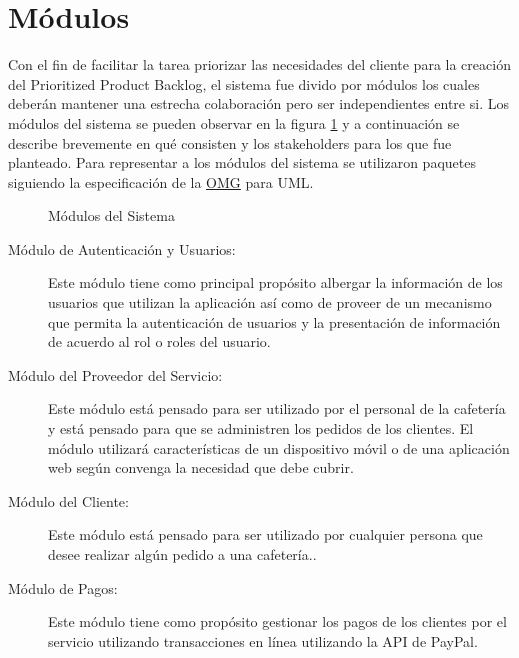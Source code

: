 \section{Módulos}

Con el fin de facilitar la tarea priorizar las necesidades del cliente para la creación del Prioritized Product Backlog, el sistema fue divido por módulos los cuales deberán mantener una estrecha colaboración pero ser independientes entre si. Los módulos del sistema se pueden observar en la figura \ref{fig:modulos} y a continuación se describe brevemente en qué consisten y los stakeholders para los que fue planteado. Para representar a los módulos del sistema se utilizaron paquetes siguiendo la especificación de la \href{https://www.omg.org}{OMG} para UML.


\begin{figure}[hbtp!]
	\begin{center}
		\caption{Módulos del Sistema}
		\label{fig:modulos}
	\end{center}
\end{figure}

\begin{description}
	\item[Módulo de Autenticación y Usuarios:] Este módulo tiene como principal propósito albergar la información de los usuarios que utilizan la aplicación así como de proveer de un mecanismo que permita la autenticación de usuarios y la presentación de información de acuerdo al rol o roles del usuario.
	\item[Módulo del Proveedor del Servicio:] Este módulo está pensado para ser utilizado por el personal de la cafetería y está pensado para que se administren los pedidos de los clientes. El módulo utilizará características de un dispositivo móvil o de una aplicación web según convenga la necesidad que debe cubrir.
	\item[Módulo del Cliente:] Este módulo está pensado para ser utilizado por cualquier persona que desee realizar algún pedido a una cafetería..
	\item[Módulo de Pagos:] Este módulo tiene como propósito gestionar los pagos de los clientes por el servicio utilizando transacciones en línea utilizando la API de PayPal.
\end{description}

